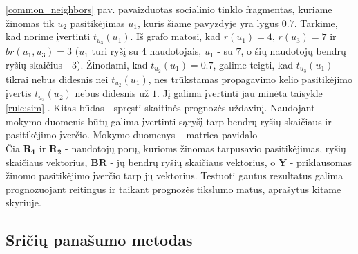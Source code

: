 \documentclass{VUMIFInfMagistrinis}
\begin{document}
\ref{common_neighbors} pav. pavaizduotas socialinio tinklo fragmentas, kuriame žinomas tik $u_2$ pasitikėjimas $u_1$, kuris šiame pavyzdyje yra lygus $0.7$. Tarkime, kad norime įvertinti $t_{u_3}(u_1)$. Iš grafo matosi, kad $r(u_1)=4$, $r(u_3) = 7$ ir $br(u_1,u_3)=3$ ($u_1$ turi ryšį su 4 naudotojais, $u_1$ - su $7$, o šių naudotojų bendrų ryšių skaičius - $3$). Žinodami, kad $t_{u_2}(u_1) = 0.7$, galime teigti, kad $t_{u_3}(u_1)$ tikrai nebus didesnis nei $t_{u_2}(u_1)$, nes trūkstamas propagavimo kelio pasitikėjimo įvertis $t_{u_3}({u_2})$ nebus didesnis už $1$. Jį galima įvertinti jau minėta taisykle \ref{rule:sim} .
Kitas būdas - spręsti skaitinės prognozės uždavinį. Naudojant mokymo duomenis būtų galima įvertinti sąryšį tarp bendrų ryšių skaičiaus ir pasitikėjimo įverčio. Mokymo duomenys – matrica pavidalo 
\begin{displaymath}
[ \boldsymbol{R_1}, \boldsymbol{R_2}, \boldsymbol{BR}, \boldsymbol{Y}]
\end{displaymath}
Čia $\boldsymbol{R_1}$ ir $\boldsymbol{R_2}$ - naudotojų porų, kurioms žinomas tarpusavio pasitikėjimas, ryšių skaičiaus vektorius, $\boldsymbol{BR}$ - jų bendrų ryšių skaičiaus vektorius, o $\boldsymbol{Y}$ - priklausomas žinomo pasitikėjimo įverčio tarp jų vektorius. Testuoti gautus rezultatus galima prognozuojant reitingus ir taikant prognozės tikslumo matus, aprašytus kitame skyriuje.

\subsection{Sričių panašumo metodas}
\end{document}
